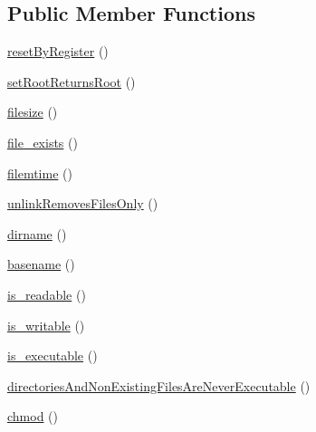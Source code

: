\subsection*{Public Member Functions}
\begin{DoxyCompactItemize}
\item 
\mbox{\hyperlink{classorg_1_1bovigo_1_1vfs_1_1vfs_stream_wrapper_test_case_a327abee782c725fcf109848a77639f47}{reset\+By\+Register}} ()
\item 
\mbox{\hyperlink{classorg_1_1bovigo_1_1vfs_1_1vfs_stream_wrapper_test_case_a81da2eaf5af266beffce8b269d3c191b}{set\+Root\+Returns\+Root}} ()
\item 
\mbox{\hyperlink{classorg_1_1bovigo_1_1vfs_1_1vfs_stream_wrapper_test_case_ae58f5bfc44861200aa7b5ccb9b7a096a}{filesize}} ()
\item 
\mbox{\hyperlink{classorg_1_1bovigo_1_1vfs_1_1vfs_stream_wrapper_test_case_abe0535742ba03d3e96065433bd9bc41d}{file\+\_\+exists}} ()
\item 
\mbox{\hyperlink{classorg_1_1bovigo_1_1vfs_1_1vfs_stream_wrapper_test_case_ad730553073cd7d21080fe7c2770ef457}{filemtime}} ()
\item 
\mbox{\hyperlink{classorg_1_1bovigo_1_1vfs_1_1vfs_stream_wrapper_test_case_a02621d3233219539b0267aa88ebde0eb}{unlink\+Removes\+Files\+Only}} ()
\item 
\mbox{\hyperlink{classorg_1_1bovigo_1_1vfs_1_1vfs_stream_wrapper_test_case_a50e82c6fcb61864d1ff1bc3b8e9dc510}{dirname}} ()
\item 
\mbox{\hyperlink{classorg_1_1bovigo_1_1vfs_1_1vfs_stream_wrapper_test_case_aefc18bd18a6d7251bc646f22b529926b}{basename}} ()
\item 
\mbox{\hyperlink{classorg_1_1bovigo_1_1vfs_1_1vfs_stream_wrapper_test_case_acd624cc6d39adeab80bd2af1e88e3065}{is\+\_\+readable}} ()
\item 
\mbox{\hyperlink{classorg_1_1bovigo_1_1vfs_1_1vfs_stream_wrapper_test_case_a65dd0d2d208a59bf607df4845171c82c}{is\+\_\+writable}} ()
\item 
\mbox{\hyperlink{classorg_1_1bovigo_1_1vfs_1_1vfs_stream_wrapper_test_case_ab1344d6b62e3fc839a1d182e5fb6266b}{is\+\_\+executable}} ()
\item 
\mbox{\hyperlink{classorg_1_1bovigo_1_1vfs_1_1vfs_stream_wrapper_test_case_af1906f61eb2432c95e1051ea520bfa5e}{directories\+And\+Non\+Existing\+Files\+Are\+Never\+Executable}} ()
\item 
\mbox{\hyperlink{classorg_1_1bovigo_1_1vfs_1_1vfs_stream_wrapper_test_case_af8bb3afefc611c88c1e5ba5db82a09da}{chmod}} ()

\end{DoxyCompactItemize}
